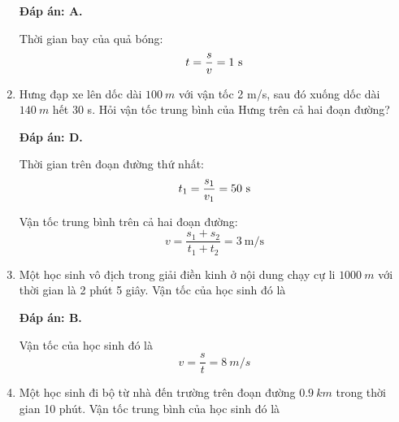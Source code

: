 \begin{enumerate}[label=\bfseries Câu \arabic*:]
	\loigiai
	{\textbf{Đáp án: A.}
		
		Thời gian bay của quả bóng:
		$$t=\dfrac{s}{v} = 1\ \text s$$
		
	}
	\item {}
	
	\cauhoi
	{Hưng đạp xe lên dốc dài $\SI{100}{m}$ với vận tốc 2 m/s, sau đó xuống dốc dài $\SI{140}{m}$ hết 30 s. Hỏi vận tốc trung bình của Hưng trên cả hai đoạn đường?
	}
	
	\loigiai
	{\textbf{Đáp án: D.}
		
		Thời gian trên đoạn đường thứ nhất:
		$$t_1=\dfrac{s_1}{v_1} = 50\ \text s$$
		
		Vận tốc trung bình trên cả hai đoạn đường:
		$$v=\dfrac{s_1+s_2}{t_1+t_2} = 3\ \text {m/s}$$
		
	}
	\item {}
	
	\cauhoi
	{
		Một học sinh vô địch trong giải điền kinh ở nội dung chạy cự li $\SI{1000}{m}$ với thời gian là 2 phút 5 giây. Vận tốc của học sinh đó là
	}
	
	\loigiai
	{\textbf{Đáp án: B.}
		
		Vận tốc của học sinh đó là
		$$v=\dfrac{s}{t} = \SI{8}{m/s}$$
		
	}
	
	\item {}
	
	\cauhoi
	{Một học sinh đi bộ từ nhà đến trường trên đoạn đường $\SI{0.9}{km}$ trong thời gian 10 phút. Vận tốc trung bình của học sinh đó là
		
}
\end{enumerate}
